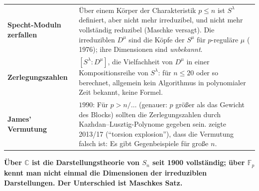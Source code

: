 \begin{warnung}
\begin{center}
{\small
\renewcommand{\arraystretch}{1.5}
\begin{tabular}{@{}P{3.2cm}P{5.4cm}@{}}
\toprule
\textbf{Specht-Moduln zerfallen} & Über einem Körper der Charakteristik $p\le n$ ist $S^{\lambda}$ definiert, aber nicht mehr irreduzibel, und nicht mehr vollständig reduzibel (Maschke versagt). Die irreduziblen $D^{\mu}$ sind die Köpfe der $S^{\mu}$ für $p$-reguläre $\mu$ ( 1976); ihre Dimensionen sind \emph{unbekannt}.\\
\textbf{Zerlegungszahlen} & $[S^{\lambda}\colon D^{\mu}]$, die Vielfachheit von $D^{\mu}$ in einer Kompositionsreihe von $S^{\lambda}$: für $n\le 20$ oder so berechnet, allgemein kein Algorithmus in polynomialer Zeit bekannt, keine Formel.\\
\textbf{James' Vermutung} & $1990$: Für $p > n/\dots$ (genauer: $p$ größer als das Gewicht des Blocks) sollten die Zerlegungszahlen durch Kazhdan--Lusztig-Polynome gegeben sein.  zeigte 2013/17 (\enquote{torsion explosion}), dass die Vermutung falsch ist: Es gibt Gegenbeispiele für große $n$.\\
\bottomrule
\end{tabular}}
\end{center}

\begin{center}
\begin{minipage}{0.9\textwidth}
\textbf{Über $\mathbb C$ ist die Darstellungstheorie von $S_n$ seit 1900 vollständig; über $\mathbb F_p$ kennt man nicht einmal die Dimensionen der irreduziblen Darstellungen. Der Unterschied ist Maschkes Satz.}
\end{minipage}
\end{center}

\begin{center}
\begin{minipage}{0.88\textwidth}
\end{minipage}
\end{center}
\end{warnung}

